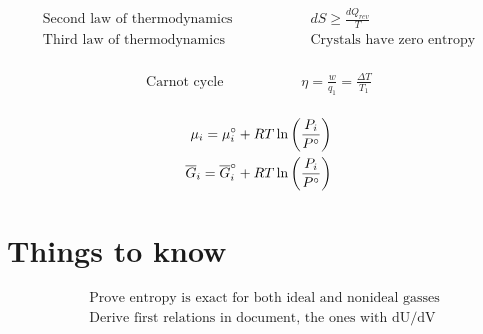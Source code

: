 \documentclass[10pt]{article} %
\begin{document}
\begin{align*}
  \mbox{Second law of thermodynamics}&\hspace{2cm} dS \geq \frac{dQ_{rev}}{T}\\
  \mbox{Third law of thermodynamics}&\hspace{2cm}\mbox{Crystals have zero entropy}\\
\end{align*}

\begin{align*}
  \mbox{Carnot cycle}&\hspace{2cm}\eta = \frac{w}{q_1} = \frac{\Delta T}{T_1}\\
\end{align*}

\begin{align*}
  \mu_i = \mu_i\degree + RT\ln\left(\frac{P_i}{P\degree}\right)\\
  \overline{G}_i = \overline{G}_i\degree + RT\ln\left(\frac{P_i}{P\degree}\right)\\
\end{align*}

\section{Things to know}
\begin{align*}
  &\mbox{Prove entropy is exact for both ideal and nonideal gasses}\\
  &\mbox{Derive first relations in document, the ones with dU/dV}\\
\end{align*}
\end{document}
